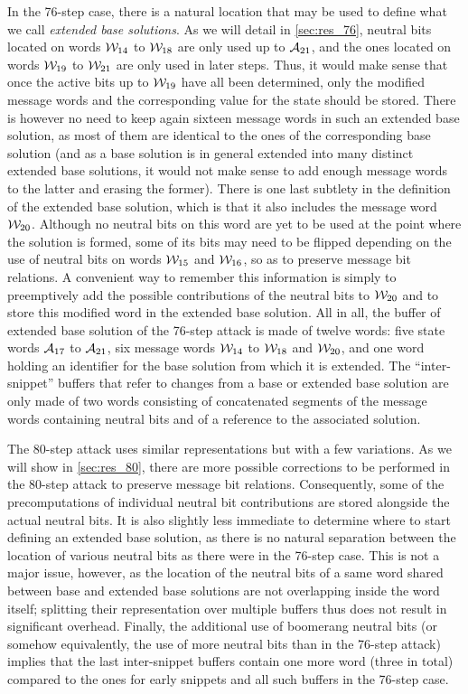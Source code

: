 In the 76-step case, there is a natural location that may be used to define what we call \emph{extended base solutions}. As we will detail in
\autoref{sec:res_76}, neutral bits located on words $\mathcal{W}_{14}$ to $\mathcal{W}_{18}$ are only used up to $\mathcal{A}_{21}$, and the ones located
on words $\mathcal{W}_{19}$ to $\mathcal{W}_{21}$ are only used in later steps. Thus, it would make sense that once the active bits up to
$\mathcal{W}_{19}$ have all been determined, only the modified message words and the corresponding value for the state should be stored. There is
however no need to keep again sixteen message words in such an extended base solution, as most of them are identical to the ones of the corresponding
base solution (and as a base solution is in general extended into many distinct extended base solutions, it would not make sense to \eg add enough
message words to the latter and erasing the former). There is one last subtlety in the definition of the extended base solution, which is that
it also includes the message word $\mathcal{W}_{20}$. Although no neutral bits on this word are yet to be used at the point where the solution is
formed, some of its bits may need to be flipped depending on the use of neutral bits on words $\mathcal{W}_{15}$ and $\mathcal{W}_{16}$, so as to
preserve message bit relations. A convenient way to remember this information is simply to preemptively add the possible contributions of the neutral
bits to $\mathcal{W}_{20}$ and to store this modified word in the extended base solution.
All in all, the buffer of extended base solution of the 76-step attack is made of twelve words: five state words $\mathcal{A}_{17}$ to $\mathcal{A}_{21}$,
six message words $\mathcal{W}_{14}$ to $\mathcal{W}_{18}$ and $\mathcal{W}_{20}$, and one word holding an identifier for the base solution from which
it is extended.
The ``inter-snippet'' buffers that refer to changes from a base or extended base solution are only made of two words consisting of concatenated
segments of the message words containing neutral bits and of a reference to the associated solution.

The 80-step attack uses similar representations but with a few variations. As we will show in \autoref{sec:res_80}, there are
more possible corrections to be performed in the 80-step attack to preserve message bit relations. Consequently, some of the precomputations of
individual neutral bit contributions are stored alongside the actual neutral bits. It is also slightly less immediate to determine where to
start defining an extended base solution, as there is no natural separation between the location of various neutral bits as there were in
the 76-step case. This is not a major issue, however, as the location of the neutral bits of a same word shared between base and extended base solutions
are not overlapping inside the word itself; splitting their representation over multiple buffers thus does not result in significant overhead.
Finally, the additional use of boomerang neutral bits (or somehow equivalently, the use of more neutral bits than in the 76-step attack)
implies that the last inter-snippet buffers contain one more word (\ie three in total) compared to the ones for early snippets and all such buffers
in the 76-step case.

